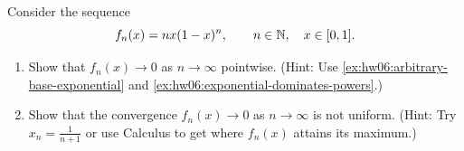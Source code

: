 \begingroup
\renewcommand{\labelenumi}{(\roman{enumi})}
\begin{exercise}
  \label{ex:hw06:moving-peaks}
  Consider the sequence
  \[
    f_n(x)=nx(1-x)^n,\qquad n\in\mathbb{N},\quad x\in[0,1].
  \]
  \begin{enumerate}
    \item Show that $f_n(x)\to0$ as $n\to\infty$ pointwise.
      (Hint: Use \autoref{ex:hw06:arbitrary-base-exponential} and
      \autoref{ex:hw06:exponential-dominates-powers}.)
    \item Show that the convergence $f_n(x)\to0$ as $n\to\infty$ is
      not uniform. (Hint: Try $x_n=\frac1{n+1}$ or use Calculus to get
      where $f_n(x)$ attains its maximum.)
  \end{enumerate}
\end{exercise}
\endgroup
